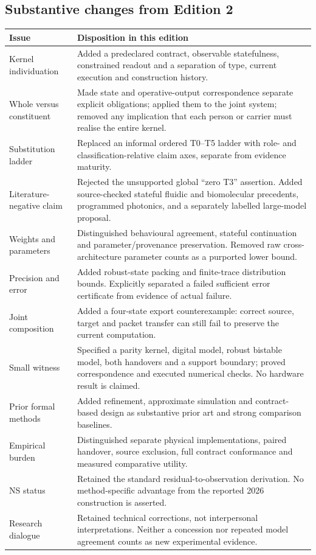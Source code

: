 \documentclass[11pt,a4paper]{article}
\theoremstyle{definition}
\theoremstyle{remark}
\begin{document}
\subsection{Substantive changes from Edition 2}
\begin{longtable}{@{}>{\raggedright\arraybackslash}p{}>{\raggedright\arraybackslash}p{}@{}}\toprule
Issue & Disposition in this edition\\\midrule\endhead
Kernel individuation & Added a predeclared contract, observable statefulness, constrained readout and a separation of type, current execution and construction history.\\
Whole versus constituent & Made state and operative-output correspondence separate explicit obligations; applied them to the joint system; removed any implication that each person or carrier must realise the entire kernel.\\
Substitution ladder & Replaced an informal ordered T0--T5 ladder with role- and classification-relative claim axes, separate from evidence maturity.\\
Literature-negative claim & Rejected the unsupported global ``zero T3'' assertion. Added source-checked stateful fluidic and biomolecular precedents, programmed photonics, and a separately labelled large-model proposal.\\
Weights and parameters & Distinguished behavioural agreement, stateful continuation and parameter/provenance preservation. Removed raw cross-architecture parameter counts as a purported lower bound.\\
Precision and error & Added robust-state packing and finite-trace distribution bounds. Explicitly separated a failed sufficient error certificate from evidence of actual failure.\\
Joint composition & Added a four-state export counterexample: correct source, target and packet transfer can still fail to preserve the current computation.\\
Small witness & Specified a parity kernel, digital model, robust bistable model, both handovers and a support boundary; proved correspondence and executed numerical checks. No hardware result is claimed.\\
Prior formal methods & Added refinement, approximate simulation and contract-based design as substantive prior art and strong comparison baselines.\\
Empirical burden & Distinguished separate physical implementations, paired handover, source exclusion, full contract conformance and measured comparative utility.\\
NS status & Retained the standard residual-to-observation derivation. No method-specific advantage from the reported 2026 construction is asserted.\\
Research dialogue & Retained technical corrections, not interpersonal interpretations. Neither a concession nor repeated model agreement counts as new experimental evidence.\\\bottomrule
\end{longtable}
\end{document}
